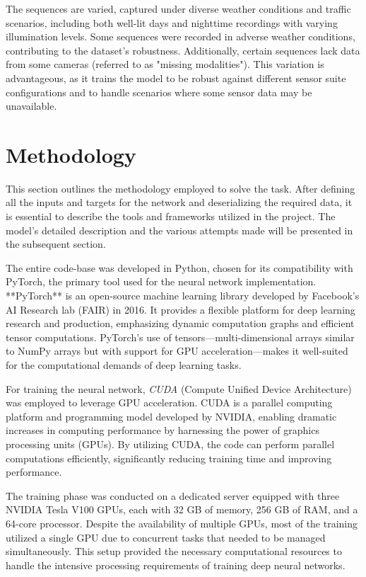 The sequences are varied, captured under diverse weather conditions and traffic scenarios, including both well-lit days and nighttime recordings with varying illumination levels. Some sequences were recorded in adverse weather conditions, contributing to the dataset's robustness. Additionally, certain sequences lack data from some cameras (referred to as "missing modalities"). This variation is advantageous, as it trains the model to be robust against different sensor suite configurations and to handle scenarios where some sensor data may be unavailable.

\section{Methodology}

This section outlines the methodology employed to solve the task. After defining all the inputs and targets for the network and deserializing the required data, it is essential to describe the tools and frameworks utilized in the project. The model's detailed description and the various attempts made will be presented in the subsequent section.

The entire code-base was developed in Python, chosen for its compatibility with PyTorch, the primary tool used for the neural network implementation. **PyTorch** is an open-source machine learning library developed by Facebook's AI Research lab (FAIR) in 2016. It provides a flexible platform for deep learning research and production, emphasizing dynamic computation graphs and efficient tensor computations. PyTorch's use of tensors—multi-dimensional arrays similar to NumPy arrays but with support for GPU acceleration—makes it well-suited for the computational demands of deep learning tasks.

For training the neural network, \textit{CUDA} (Compute Unified Device Architecture) was employed to leverage GPU acceleration. CUDA is a parallel computing platform and programming model developed by NVIDIA, enabling dramatic increases in computing performance by harnessing the power of graphics processing units (GPUs). By utilizing CUDA, the code can perform parallel computations efficiently, significantly reducing training time and improving performance.

The training phase was conducted on a dedicated server equipped with three NVIDIA Tesla V100 GPUs, each with 32 GB of memory, 256 GB of RAM, and a 64-core processor. Despite the availability of multiple GPUs, most of the training utilized a single GPU due to concurrent tasks that needed to be managed simultaneously. This setup provided the necessary computational resources to handle the intensive processing requirements of training deep neural networks.

